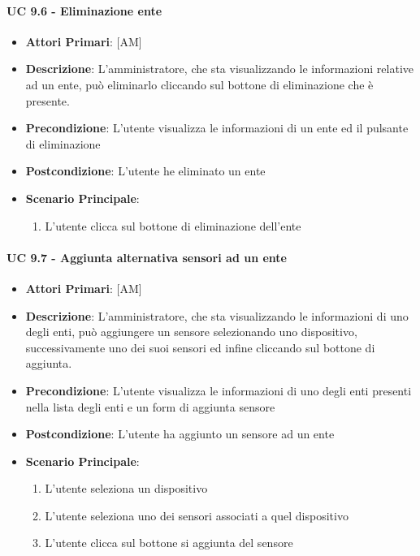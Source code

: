 			\paragraph{UC 9.6 - Eliminazione ente}
			\begin{itemize}
				\item \textbf{Attori Primari}: [AM]
				\item \textbf{Descrizione}: L'amministratore, che sta visualizzando le informazioni relative ad un ente, può eliminarlo cliccando sul bottone di eliminazione che è presente.
				\item \textbf{Precondizione}: L'utente visualizza le informazioni di un ente ed il pulsante di eliminazione
				\item \textbf{Postcondizione}: L'utente he eliminato un ente
				\item \textbf{Scenario Principale}:
				\begin{enumerate}
					\item{L'utente clicca sul bottone di eliminazione dell'ente}
				\end{enumerate}	
			\end{itemize}	

			\paragraph{UC 9.7 - Aggiunta alternativa sensori ad un ente}
			\begin{itemize}
				\item \textbf{Attori Primari}: [AM]
				\item \textbf{Descrizione}: L'amministratore, che sta visualizzando le informazioni di uno degli enti, può aggiungere un sensore selezionando uno dispositivo, successivamente uno dei suoi sensori ed infine cliccando sul bottone di aggiunta.
				\item \textbf{Precondizione}: L'utente visualizza le informazioni di uno degli enti presenti nella lista degli enti e un form di aggiunta sensore
				\item \textbf{Postcondizione}: L'utente ha aggiunto un sensore ad un ente
				\item \textbf{Scenario Principale}:
				\begin{enumerate}
					\item{L'utente seleziona un dispositivo}
					\item{L'utente seleziona uno dei sensori associati a quel dispositivo}
					\item{L'utente clicca sul bottone si aggiunta del sensore}
				\end{enumerate}	
			\end{itemize}

